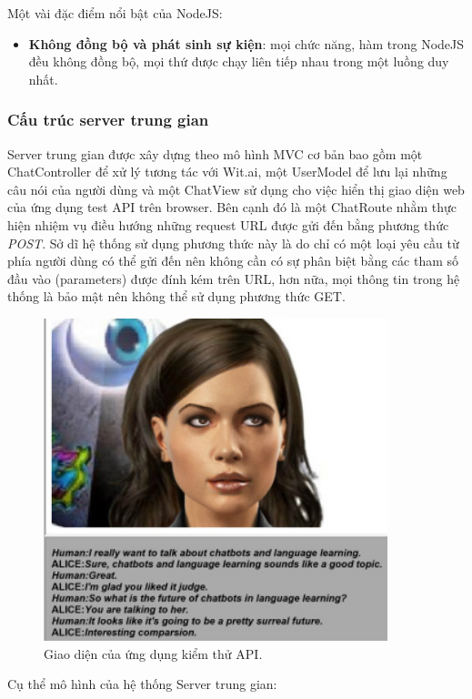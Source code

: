\documentclass[12pt]{report}
\begin{document}
Một vài đặc điểm nổi bật của NodeJS:

\begin{itemize}
	\item \textbf{Không đồng bộ và phát sinh sự kiện}: mọi chức năng, hàm trong NodeJS đều không đồng bộ, mọi thứ được chạy liên tiếp nhau trong một luồng duy nhất.
\end{itemize}

\subsubsection{Cấu trúc server trung gian}

Server trung gian được xây dựng theo mô hình MVC cơ bản bao gồm một ChatController để xử lý tương tác với Wit.ai, một UserModel để lưu lại những câu nói của người dùng và một ChatView sử dụng cho việc hiển thị giao diện web của ứng dụng test API trên browser. Bên cạnh đó là một ChatRoute nhằm thực hiện nhiệm vụ điều hướng những request URL được gửi đến bằng phương thức \textit{POST}. Sở dĩ hệ thống sử dụng phương thức này là do chỉ có một loại yêu cầu từ phía người dùng có thể gửi đến nên không cần có sự phân biệt bằng các tham số đầu vào (parameters) được đính kém trên URL, hơn nữa, mọi thông tin trong hệ thống là bảo mật nên không thể sử dụng phương thức GET.

\begin{figure}[H]
	\centering
    \includegraphics[width=10cm]{Pics/Chap1/alice.jpg}
  	\caption{Giao diện của ứng dụng kiểm thử API.}
\end{figure}

Cụ thể mô hình của hệ thống Server trung gian:
\end{document}
